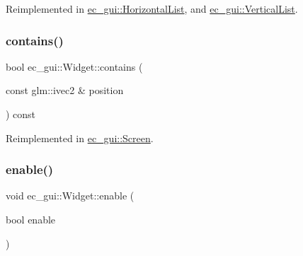 Reimplemented in \mbox{\hyperlink{classec__gui_1_1_horizontal_list_a1617ae9942c10e9b277e222ce4d3484f}{ec\+\_\+gui\+::\+Horizontal\+List}}, and \mbox{\hyperlink{classec__gui_1_1_vertical_list_aecea73019d3c1eb2edf95af5afef90d0}{ec\+\_\+gui\+::\+Vertical\+List}}.

\mbox{\label{classec__gui_1_1_widget_a90f689c8153f17454ce2d52458703a26}} 
\subsubsection{\texorpdfstring{contains()}{contains()}}
{\footnotesize\ttfamily bool ec\+\_\+gui\+::\+Widget\+::contains (\begin{DoxyParamCaption}\item[{const glm\+::ivec2 \&}]{position }\end{DoxyParamCaption}) const\hspace{0.3cm}{\ttfamily [virtual]}}



Reimplemented in \mbox{\hyperlink{classec__gui_1_1_screen_a0948bb5fb9286b2c95045282f21f21cc}{ec\+\_\+gui\+::\+Screen}}.

\mbox{\label{classec__gui_1_1_widget_aa1f6918bb9e69eb81aedd6e6b895434e}} 
\subsubsection{\texorpdfstring{enable()}{enable()}}
{\footnotesize\ttfamily void ec\+\_\+gui\+::\+Widget\+::enable (\begin{DoxyParamCaption}\item[{bool}]{enable }\end{DoxyParamCaption})\hspace{0.3cm}{\ttfamily [virtual]}}

\mbox{\label{classec__gui_1_1_widget_aafd098af0f1918fe1998923b3b79b315}} 

